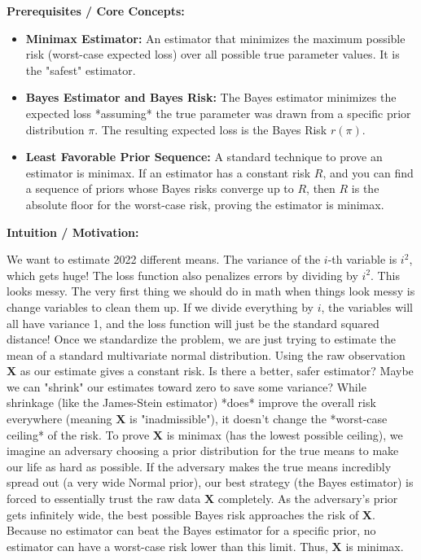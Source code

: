 \begin{solution}
\textbf{Prerequisites / Core Concepts:}
\begin{itemize}
    \item \textbf{Minimax Estimator:} An estimator that minimizes the maximum possible risk (worst-case expected loss) over all possible true parameter values. It is the "safest" estimator.
    \item \textbf{Bayes Estimator and Bayes Risk:} The Bayes estimator minimizes the expected loss *assuming* the true parameter was drawn from a specific prior distribution $\pi$. The resulting expected loss is the Bayes Risk $r(\pi)$.
    \item \textbf{Least Favorable Prior Sequence:} A standard technique to prove an estimator is minimax. If an estimator has a constant risk $R$, and you can find a sequence of priors whose Bayes risks converge up to $R$, then $R$ is the absolute floor for the worst-case risk, proving the estimator is minimax.
\end{itemize}

\textbf{Intuition / Motivation:}

We want to estimate 2022 different means. The variance of the $i$-th variable is $i^2$, which gets huge! The loss function also penalizes errors by dividing by $i^2$. 
This looks messy. The very first thing we should do in math when things look messy is change variables to clean them up. If we divide everything by $i$, the variables will all have variance 1, and the loss function will just be the standard squared distance!
Once we standardize the problem, we are just trying to estimate the mean of a standard multivariate normal distribution. Using the raw observation $\mathbf{X}$ as our estimate gives a constant risk.
Is there a better, safer estimator? Maybe we can "shrink" our estimates toward zero to save some variance? While shrinkage (like the James-Stein estimator) *does* improve the overall risk everywhere (meaning $\mathbf{X}$ is "inadmissible"), it doesn't change the *worst-case ceiling* of the risk.
To prove $\mathbf{X}$ is minimax (has the lowest possible ceiling), we imagine an adversary choosing a prior distribution for the true means to make our life as hard as possible. If the adversary makes the true means incredibly spread out (a very wide Normal prior), our best strategy (the Bayes estimator) is forced to essentially trust the raw data $\mathbf{X}$ completely. As the adversary's prior gets infinitely wide, the best possible Bayes risk approaches the risk of $\mathbf{X}$. Because no estimator can beat the Bayes estimator for a specific prior, no estimator can have a worst-case risk lower than this limit. Thus, $\mathbf{X}$ is minimax.


\end{solution}

